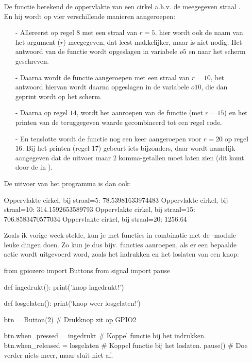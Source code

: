 De functie  berekend de oppervlakte van een cirkel a.h.v. de meegegeven straal . En hij wordt op vier verschillende manieren aangeroepen:
\begin{enumerate}
	\item[-] Allereerst op regel $8$ met een straal van $r=5$, hier wordt ook de naam van het argument ($r$) meegegeven, dat leest makkelijker, maar is niet nodig. Het antwoord van de functie wordt opgeslagen in variabele $o5$ en naar het scherm geschreven. 

	\item[-] Daarna wordt de functie aangeroepen met een straal van $r=10$, het antwoord hiervan wordt daarna opgeslagen in de variabele $o10$, die dan geprint wordt op het scherm. 

	\item[-] Daarna op regel $14$, wordt het aanroepen van de functie (met $r=15$) en het printen van de teruggegeven waarde gecombineerd tot een regel code. 

	\item[-] En tenslotte wordt de functie nog een keer aangeroepen voor $r=20$ op regel $16$. Bij het printen (regel $17$) gebeurt iets bijzonders, daar wordt namelijk aangegeven dat de uitvoer maar $2$ komma-getallen moet laten zien (dit komt door de  in ). 
\end{enumerate}

De uitvoer van het programma is dan ook:
\begin{python}
Oppervlakte cirkel, bij straal=5:  78.53981633974483
Oppervlakte cirkel, bij straal=10: 314.1592653589793
Oppervlakte cirkel, bij straal=15: 706.8583470577034
Oppervlakte cirkel, bij straal=20: 1256.64
\end{python}

\newpage
Zoals ik vorige week stelde, kun je met functies in combinatie met de -module leuke dingen doen. Zo kun je dus bijv. functies aanroepen, als er een bepaalde actie wordt uitgevoerd word, zoals het indrukken en het loslaten van een knop:
\begin{python}
from gpiozero import Buttons
from signal import pause

def ingedrukt():
	print('knop ingedrukt!')

def losgelaten():
	print('knop weer losgelaten!')

btn = Button(2)  # Drukknop zit op GPIO2

btn.when_pressed = ingedrukt    # Koppel functie bij het indrukken.
btn.when_released = losgelaten  # Koppel functie bij het loslaten.
pause()                         # Doe verder niets meer, maar sluit niet af.
\end{python}

